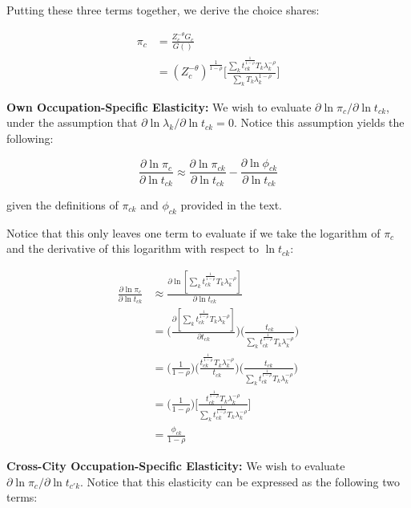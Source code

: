 \documentclass[10pt]{article}
\begin{document}
Putting these three terms together, we derive the choice shares:

\begin{align*}
    \pi_{c} & = \frac{Z_{c}^{-\theta}{G_{c}}}{G()} \\ &= (Z_{c}^{-\theta})^{\frac{1}{1-\rho}}\Bigg[\frac{\sum\limits_{k}{t^{\frac{1}{1-\rho}}_{ck}}{T_{k}}\lambda_{k}^{-\rho}}{\sum\limits_{k}{T_{k}}\lambda_{k}^{1-\rho}}\Bigg]
\end{align*}

\noindent\textbf{Own Occupation-Specific Elasticity:} We wish to evaluate $\partial\ln{\pi_{c}}/\partial\ln{t_{ck}}$, under the assumption that $\partial\ln{\lambda_{k}}/\partial\ln{t_{ck}}=0$. Notice this assumption yields the following:

\begin{equation*}
    \frac{\partial\ln{\pi_{c}}}{\partial\ln{t_{ck}}} \approx \frac{\partial\ln{\pi_{ck}}}{\partial\ln{t_{ck}}} - \frac{\partial\ln{\phi_{ck}}}{\partial\ln{t_{ck}}}
\end{equation*}

given the definitions of $\pi_{ck}$ and $\phi_{ck}$ provided in the text.

Notice that this only leaves one term to evaluate if we take the logarithm of $\pi_{c}$ and the derivative of this logarithm with respect to $\ln{t_{ck}}$:

\begin{align*}
    \frac{\partial\ln{\pi_{c}}}{\partial\ln{t_{ck}}} & \approx \frac{\partial\ln[{\sum\limits_{k}{t^{\frac{1}{1-\rho}}_{ck}}{T_{k}}\lambda_{k}^{-\rho}}]}{\partial\ln{t_{ck}}} \\ &= \Bigg(\frac{\partial[{\sum\limits_{k}{t^{\frac{1}{1-\rho}}_{ck}}{T_{k}}\lambda_{k}^{-\rho}}]}{\partial{t_{ck}}}\Bigg)\Bigg(\frac{t_{ck}}{{\sum\limits_{k}{t^{\frac{1}{1-\rho}}_{ck}}{T_{k}}\lambda_{k}^{-\rho}}}\Bigg)\\ &= \Bigg(\frac{1}{1-\rho}\Bigg)\Bigg(\frac{t_{ck}^{\frac{1}{1-\rho}}{T_{k}}\lambda_{k}^{-\rho}}{t_{ck}}\Bigg)\Bigg(\frac{t_{ck}}{{\sum\limits_{k}{t^{\frac{1}{1-\rho}}_{ck}}{T_{k}}\lambda_{k}^{-\rho}}}\Bigg) \\ &= \Big(\frac{1}{1-\rho}\Big)\Bigg[\frac{{t^{\frac{1}{1-\rho}}_{ck}}{T_{k}}\lambda_{k}^{-\rho}}{\sum\limits_{k}{t^{\frac{1}{1-\rho}}_{ck}}{T_{k}}\lambda_{k}^{-\rho}}\Bigg]\\ &= \frac{\phi_{ck}}{1-\rho}
\end{align*}

\noindent\textbf{Cross-City Occupation-Specific Elasticity:} We wish to evaluate $\partial\ln{\pi_{c}}/\partial\ln{t_{{c'}k}}$. Notice that this elasticity can be expressed as the following two terms:
\end{document}
